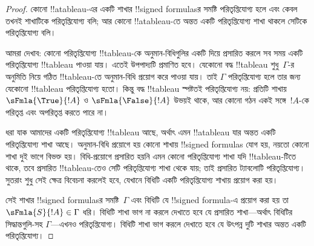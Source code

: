 \documentclass[../../../include/open-logic-section]{subfiles}
\begin{document}
\begin{proof}
কোনো !!a{tableau}-এর একটি শাখার !!{signed formula}sর সমষ্টি
পরিতৃপ্তিযোগ্য হলে এবং কেবল তখনই শাখাটিকে পরিতৃপ্তিযোগ্য বলি; আর
কোনো !!a{tableau}-তে অন্তত একটি পরিতৃপ্তিযোগ্য শাখা থাকলে সেটিকে
পরিতৃপ্তিযোগ্য বলি।

আমরা দেখাব: কোনো পরিতৃপ্তিযোগ্য !!{tableau}-কে অনুমান-বিধিগুলির
একটি দিয়ে প্রসারিত করলে সব সময় একটি পরিতৃপ্তিযোগ্য !!{tableau}
পাওয়া যায়। এতেই উপপাদ্যটি প্রমাণিত হবে। যেকোনো বদ্ধ !!{tableau}
শুধু~$\Gamma$-র অনুমিতি নিয়ে গঠিত !!{tableau}-তে অনুমান-বিধি
প্রয়োগ করে পাওয়া যায়। তাই $\Gamma$ পরিতৃপ্তিযোগ্য হলে তার জন্য
যেকোনো !!{tableau} পরিতৃপ্তিযোগ্য হতো। কিন্তু বদ্ধ !!{tableau}
স্পষ্টতই পরিতৃপ্তিযোগ্য নয়: প্রতিটি শাখায়
$\sFmla{\True}{!A}$ ও $\sFmla{\False}{!A}$ উভয়ই থাকে, আর কোনো গঠন
একই সঙ্গে~$!A$-কে পরিতৃপ্ত এবং অপরিতৃপ্ত করতে পারে না।

ধরা যাক আমাদের একটি পরিতৃপ্তিযোগ্য !!{tableau} আছে, অর্থাৎ এমন
!!a{tableau} যার অন্তত একটি পরিতৃপ্তিযোগ্য শাখা আছে। অনুমান-বিধি
প্রয়োগে হয় কোনো শাখায় !!{signed formula}s যোগ হয়, নয়তো কোনো
শাখা দুই ভাগে বিভক্ত হয়। বিধি-প্রয়োগে প্রসারিত হয়নি এমন কোনো
পরিতৃপ্তিযোগ্য শাখা যদি !!{tableau}-টিতে থাকে, তবে প্রসারিত
!!{tableau}-তেও সেটি পরিতৃপ্তিযোগ্য শাখা থেকে যায়; তাই প্রসারিত
ট্যাবলোটি পরিতৃপ্তিযোগ্য। সুতরাং শুধু সেই ক্ষেত্র বিবেচনা করলেই হবে,
যেখানে বিধিটি একটি পরিতৃপ্তিযোগ্য শাখায় প্রয়োগ করা হয়।

সেই শাখার !!{signed formula}sর সমষ্টি~$\Gamma$ এবং বিধিটি যে
!!{signed formula}-এ প্রয়োগ করা হয় তা
$\sFmla{S}{!A} \in \Gamma$ ধরি। বিধিটি শাখা ভাগ না করলে দেখাতে হবে
যে প্রসারিত শাখা—অর্থাৎ বিধিটির সিদ্ধান্তগুলি-সহ $\Gamma$—এখনও
পরিতৃপ্তিযোগ্য। বিধিটি শাখা ভাগ করলে দেখাতে হবে যে উৎপন্ন দুটি
শাখার অন্তত একটি পরিতৃপ্তিযোগ্য।


\end{proof}
\end{document}
